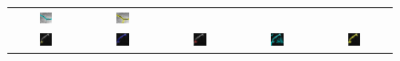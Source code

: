 \begin{figure}[t]
\begin{tabular}{@{}ccccc@{}}
\includegraphics[width=0.19\textwidth]{images/L2S_compare_region/22_trng_Li}	&
\includegraphics[width=0.19\textwidth]{images/L2S_compare_region/22_trng_ours}	
\\
\includegraphics[width=0.19\textwidth]{images/L2S_compare_region/dendrites2_orig}	&
\includegraphics[width=0.19\textwidth]{images/L2S_compare_region/dendrites2_CV}	&
\includegraphics[width=0.19\textwidth]{images/L2S_compare_region/dendrites2_Lankton} &
\includegraphics[width=0.19\textwidth]{images/L2S_compare_region/dendrites2_Li}	&
\includegraphics[width=0.19\textwidth]{images/L2S_compare_region/dendrites2_ours}	

\end{tabular}
\end{figure}
